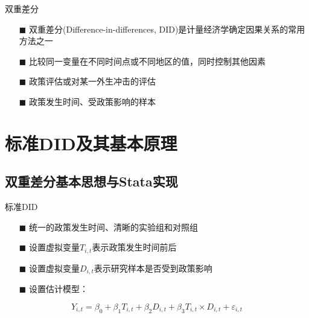 \documentclass[aspectratio=169]{beamer}
\begin{document}
\begin{frame}{双重差分}
    \begin{itemize}
        \item[$\blacksquare$] 双重差分(Difference-in-differences, DID)是计量经济学确定因果关系的常用方法之一
        \item[$\blacksquare$] 比较同一变量在不同时间点或不同地区的值，同时控制其他因素
        \item[$\blacksquare$] 政策评估或对某一外生冲击的评估
        \item[$\blacksquare$] 政策发生时间、受政策影响的样本
    \end{itemize}
\end{frame}


\section{标准DID及其基本原理}

\subsection{双重差分基本思想与Stata实现}

\begin{frame}{标准DID}
    \begin{itemize}
        \item[$\blacksquare$] 统一的政策发生时间、清晰的实验组和对照组
        \item[$\blacksquare$] 设置虚拟变量$T_{i,t}$表示政策发生时间前后
        \item[$\blacksquare$] 设置虚拟变量$D_{i,t}$表示研究样本是否受到政策影响
        \item[$\blacksquare$] 设置估计模型：
    \end{itemize}
    \begin{equation*}
        Y_{i,t}=\beta _0+\beta _1T_{i,t}+\beta _2D_{i,t}+\beta _3T_{i,t}\times D_{i,t}+\varepsilon _{i,t}
    \end{equation*}
\end{frame}
\end{document}
